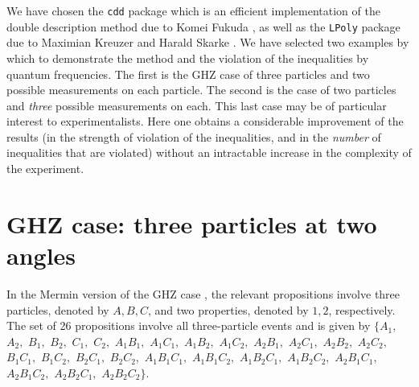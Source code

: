 We have chosen the {\tt cdd} package \cite{cdd-pck} which is an efficient
implementation of the double description method  \cite{MRTT53}
due to Komei Fukuda \cite{FP96,fukuda-94,fukuda-pr},
as well as the {\tt LPoly} package due to Maximian Kreuzer and Harald Skarke \cite{kreuzer-skarke}.
We have selected two examples by which to demonstrate the method and the
violation
of the inequalities by quantum frequencies. The first is the GHZ case of
three particles
and two possible measurements on each particle. The second is the case of
two particles
and {\em three} possible measurements on each. This last case
may be of particular interest to
experimentalists. Here one obtains a considerable improvement of the results
(in the strength
of violation of the inequalities, and in the {\em number} of inequalities
that are violated) without
an intractable increase in the complexity of the experiment.






\section{GHZ case: three particles at two angles}


In the Mermin version \cite{mermin,mermin-93} of the GHZ case \cite{ghz,ghsz},
the relevant propositions involve three particles,
denoted by $A,B,C$,
and two properties, denoted by $1,2$, respectively.
The set of 26 propositions involve all three-particle events and is given by
$\{
 A_1        ,$ $
 A_2        ,$ $
 B_1        ,$ $
 B_2        ,$ $
 C_1        ,$ $
 C_2        ,$ $
 A_1B_1     ,$ $
 A_1C_1     ,$ $
 A_1B_2     ,$ $
 A_1C_2     ,$ $
 A_2B_1     ,$ $
 A_2C_1     ,$ $
 A_2B_2     ,$ $
 A_2C_2     ,$ $
 B_1C_1     ,$ $
 B_1C_2     ,$ $
 B_2C_1     ,$ $
 B_2C_2     ,$ $
 A_1B_1C_1  ,$ $
 A_1B_1C_2  ,$ $
 A_1B_2C_1  ,$ $
 A_1B_2C_2  ,$ $
 A_2B_1C_1  ,$ $
 A_2B_1C_2  ,$ $
 A_2B_2C_1  ,$ $
 A_2B_2C_2
\}$.


